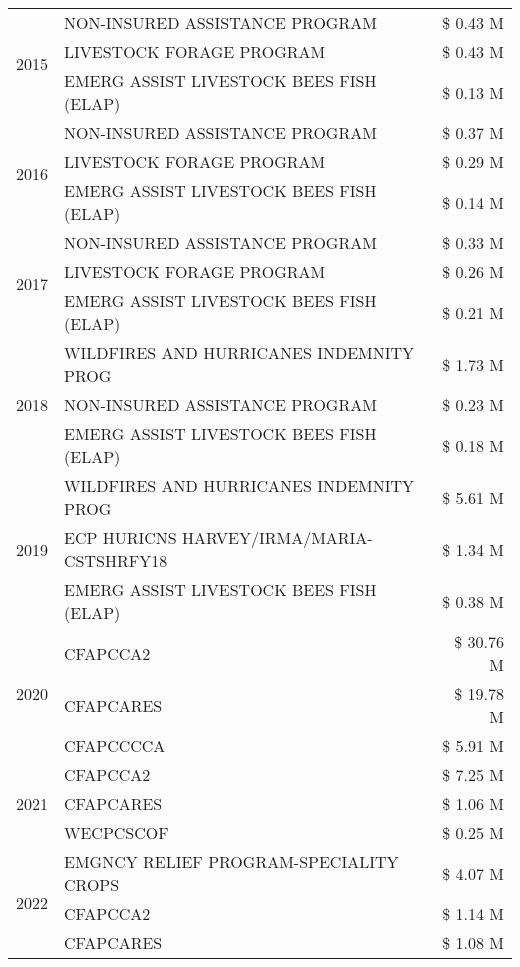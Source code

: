 \begin{tabular}{llr}
\cline{1-3}
\multirow[t]{3}{*}{2015} & NON-INSURED ASSISTANCE PROGRAM & \$ 0.43 M \\
 & LIVESTOCK FORAGE PROGRAM & \$ 0.43 M \\
 & EMERG ASSIST LIVESTOCK BEES FISH (ELAP) & \$ 0.13 M \\
\cline{1-3}
\multirow[t]{3}{*}{2016} & NON-INSURED ASSISTANCE PROGRAM & \$ 0.37 M \\
 & LIVESTOCK FORAGE PROGRAM & \$ 0.29 M \\
 & EMERG ASSIST LIVESTOCK BEES FISH (ELAP) & \$ 0.14 M \\
\cline{1-3}
\multirow[t]{3}{*}{2017} & NON-INSURED ASSISTANCE PROGRAM & \$ 0.33 M \\
 & LIVESTOCK FORAGE PROGRAM & \$ 0.26 M \\
 & EMERG ASSIST LIVESTOCK BEES FISH (ELAP) & \$ 0.21 M \\
\cline{1-3}
\multirow[t]{3}{*}{2018} & WILDFIRES AND HURRICANES INDEMNITY PROG & \$ 1.73 M \\
 & NON-INSURED ASSISTANCE PROGRAM & \$ 0.23 M \\
 & EMERG ASSIST LIVESTOCK BEES FISH (ELAP) & \$ 0.18 M \\
\cline{1-3}
\multirow[t]{3}{*}{2019} & WILDFIRES AND HURRICANES INDEMNITY PROG & \$ 5.61 M \\
 & ECP HURICNS HARVEY/IRMA/MARIA-CSTSHRFY18 & \$ 1.34 M \\
 & EMERG ASSIST LIVESTOCK BEES FISH (ELAP) & \$ 0.38 M \\
\cline{1-3}
\multirow[t]{3}{*}{2020} & CFAPCCA2 & \$ 30.76 M \\
 & CFAPCARES & \$ 19.78 M \\
 & CFAPCCCCA & \$ 5.91 M \\
\cline{1-3}
\multirow[t]{3}{*}{2021} & CFAPCCA2 & \$ 7.25 M \\
 & CFAPCARES & \$ 1.06 M \\
 & WECPCSCOF & \$ 0.25 M \\
\cline{1-3}
\multirow[t]{3}{*}{2022} & EMGNCY RELIEF PROGRAM-SPECIALITY CROPS & \$ 4.07 M \\
 & CFAPCCA2 & \$ 1.14 M \\
 & CFAPCARES & \$ 1.08 M \\
\cline{1-3}
\bottomrule
\end{tabular}
